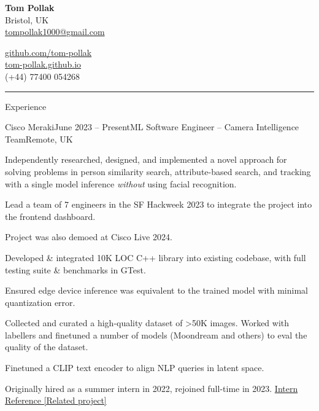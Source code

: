 \documentclass{structure}
\begin{document}
\parbox{0.5\textwidth}{
    {\namesize\textbf{Tom Pollak}} \\[6pt]
    Bristol, UK\\
    \href{mailto:tompollak1000@gmail.com}{tompollak1000@gmail.com}
}
\hfill
\parbox{0.5\textwidth}{
    \vspace*{10pt}

    \begin{flushright}

        \href{https://github.com/tom-pollak}{github.com/tom-pollak} \\
        \href{https://tom-pollak.github.io}{tom-pollak.github.io} \\
        (+44) 77400 054268
    \end{flushright}

}

\smallskip
\hrule
\smallskip


\begin{rSection}{Experience}

    \begin{rSubsection}{Cisco Meraki}{June 2023 -- Present}{ML Software Engineer -- Camera Intelligence Team}{Remote, UK}{}{}
        \item Independently researched, designed, and implemented a novel approach for solving problems in person similarity search, attribute-based search, and tracking with a single model inference \textit{without} using facial recognition.
        \item Lead a team of 7 engineers in the SF Hackweek 2023 to integrate the project into the frontend dashboard.
        \item Project was also demoed at Cisco Live 2024.
        \item Developed \& integrated 10K LOC C++ library into existing codebase, with full testing suite \& benchmarks in GTest.
        \item Ensured edge device inference was equivalent to the trained model with minimal quantization error.
        \item Collected and curated a high-quality dataset of >50K images. Worked with labellers and finetuned a number of models (Moondream and others) to eval the quality of the dataset.
        \item Finetuned a CLIP text encoder to align NLP queries in latent space.
        \item Originally hired as a summer intern in 2022, rejoined full-time in 2023. \href{https://gist.githubusercontent.com/tom-pollak/1a2e8c1fc61ba269e25c73c02c78007c/raw/45c8cbceda8cd745d6d00cb16a09979778df663b/gistfile1.txt}{{\color{blue}Intern Reference} [Related project]}
    \end{rSubsection}

\end{rSection}
\end{document}
